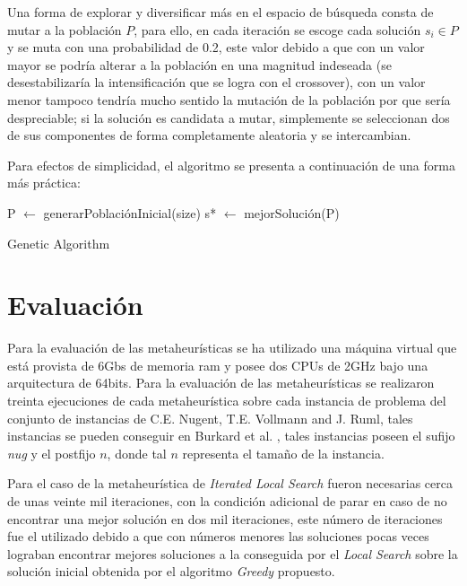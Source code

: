 \documentclass{ci5652}
\begin{document}
Una forma de explorar y diversificar más en el espacio de búsqueda consta de mutar a la población \(P\), para ello, en cada iteración se escoge cada solución \(s_{i} \in P\) y se muta con una probabilidad de 0.2, este valor debido a que con un valor mayor se podría alterar a la población en una magnitud indeseada (se desestabilizaría la intensificación que se logra con el crossover), con un valor menor tampoco tendría mucho sentido la mutación de la población por que sería despreciable; si la solución es candidata a mutar, simplemente se seleccionan dos de sus componentes de forma completamente aleatoria y se intercambian.

Para efectos de simplicidad, el algoritmo se presenta a continuación de una forma más práctica:

\begin{algorithm}
 \DontPrintSemicolon
 \vspace*{0.1cm}
 P $\leftarrow$ generarPoblaciónInicial(size)\;
 s* $\leftarrow$ mejorSolución(P)\;
 
 \vspace*{0.1cm}
 \caption{Genetic Algorithm}
\end{algorithm}

\section{Evaluación}

Para la evaluación de las metaheurísticas se ha utilizado una máquina virtual que está provista de 6Gbs de memoria ram y posee dos CPUs de 2GHz bajo una arquitectura de 64bits. Para la evaluación de las metaheurísticas se realizaron treinta ejecuciones de cada metaheurística sobre cada instancia de problema del conjunto de instancias de C.E. Nugent, T.E. Vollmann and J. Ruml, tales instancias se pueden conseguir en Burkard et al. \cite{burkard2012}, tales instancias poseen el sufijo \textit{nug} y el postfijo \(n\), donde tal \(n\) representa el tamaño de la instancia.

Para el caso de la metaheurística de \textit{Iterated Local Search} fueron necesarias cerca de unas veinte mil iteraciones, con la condición adicional de parar en caso de no encontrar una mejor solución en dos mil iteraciones, este número de iteraciones fue el utilizado debido a que con números menores las soluciones pocas veces lograban encontrar mejores soluciones a la conseguida por el \textit{Local Search} sobre la solución inicial obtenida por el algoritmo \textit{Greedy} propuesto.
\end{document}
